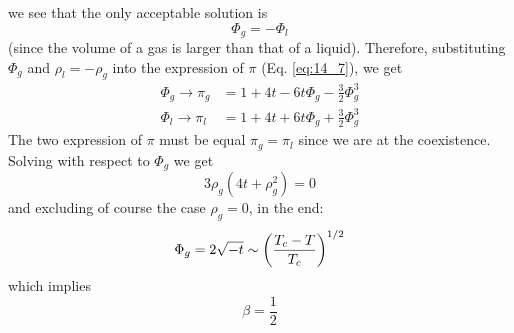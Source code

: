 \documentclass[../main/main.tex]{subfiles}
\begin{document}
we see that the only acceptable solution is
\begin{equation}
  \Phi _g = - \Phi _l
\end{equation}
(since the volume of a gas is larger than that of a liquid). Therefore, substituting
\( \Phi _g \) and \( \rho _l = - \rho _g \)  into the expression of \( \pi  \) (Eq. \eqref{eq:14_7}), we get
\begin{subequations}
\begin{align*}
  \Phi _g \rightarrow \pi_g  &= 1 + 4 t - 6 t \Phi _g - \frac{3}{2} \Phi _g^3  \\
    \Phi _l \rightarrow \pi_l  &= 1 + 4 t + 6 t \Phi _g + \frac{3}{2} \Phi _g^3
\end{align*}
\end{subequations}
The two expression of \( \pi  \)  must be equal \( \pi _g = \pi _l \) since we are at the coexistence. Solving with respect to \( \Phi _g \) we get
\begin{equation*}
3\rho _g (4t+ \rho _g^2) = 0
\end{equation*}
and excluding of course the case  \( \rho _g = 0 \), in the end:
\begin{equation}
  \Phi _g = 2 \sqrt{-t} \sim \qty(\frac{T_c-T}{T_c})^{1/2}
\end{equation}
which implies
\begin{equation}
  \beta = \frac{1}{2}
\end{equation}
\end{document}
